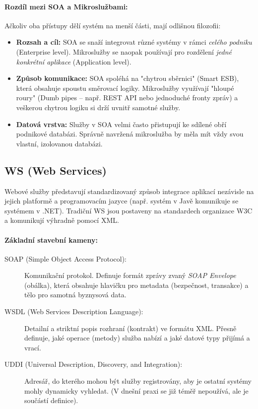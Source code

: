 \paragraph*{Rozdíl mezi SOA a Mikroslužbami:}
Ačkoliv oba přístupy dělí systém na menší části, mají odlišnou filozofii:
\begin{itemize}
    \item \textbf{Rozsah a cíl:} SOA se snaží integrovat různé systémy v rámci \textit{celého podniku} (Enterprise level). Mikroslužby se naopak používají pro rozdělení \textit{jedné konkrétní aplikace} (Application level).
    \item \textbf{Způsob komunikace:} SOA spoléhá na "chytrou sběrnici" (Smart ESB), která obsahuje spoustu směrovací logiky. Mikroslužby využívají "hloupé roury" (Dumb pipes – např. REST API nebo jednoduché fronty zpráv) a veškerou chytrou logiku si drží uvnitř samotné služby.
    \item \textbf{Datová vrstva:} Služby v SOA velmi často přistupují ke sdílené obří podnikové databázi. Správně navržená mikroslužba by měla mít vždy svou vlastní, izolovanou databázi.
\end{itemize}

\subsection{WS (Web Services)}
Webové služby představují standardizovaný způsob integrace aplikací nezávisle na jejich platformě a programovacím jazyce (např. systém v Javě komunikuje se systémem v .NET). Tradiční WS jsou postaveny na standardech organizace W3C a komunikují výhradně pomocí XML.

\newpage
\paragraph*{Základní stavební kameny:}
\begin{description}
    \item[SOAP (Simple Object Access Protocol):] Komunikační protokol. Definuje formát zprávy zvaný \textit{SOAP Envelope} (obálka), která obsahuje hlavičku pro metadata (bezpečnost, transakce) a tělo pro samotná byznysová data.
    \item[WSDL (Web Services Description Language):] Detailní a striktní popis rozhraní (kontrakt) ve formátu XML. Přesně definuje, jaké operace (metody) služba nabízí a jaké datové typy přijímá a vrací. 
    \item[UDDI (Universal Description, Discovery, and Integration):] Adresář, do kterého mohou být služby registrovány, aby je ostatní systémy mohly dynamicky vyhledat. (V dnešní praxi se již téměř nepoužívá, ale je součástí definice).
\end{description}

